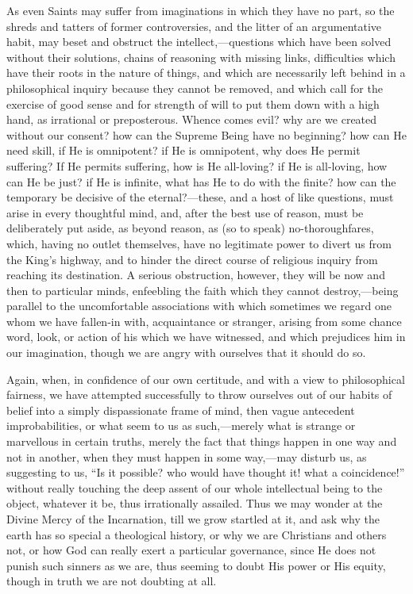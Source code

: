As even Saints may suffer from imaginations in which they
have no part, so the shreds and tatters of former controversies, and
the litter of an argumentative habit, may beset and obstruct the
intellect,—questions which have been solved without their solutions,
chains of reasoning with missing links, difficulties which have their
roots in the nature of things, and which are necessarily left behind
in a philosophical inquiry because they cannot be removed, and which
call for the exercise of good sense and for strength of will to put
them down with a high hand, as irrational or preposterous. Whence
comes evil? why are we created without our consent? how can the
Supreme Being have no beginning? how can He need skill, if He is
omnipotent? if He is omnipotent, why does He permit suffering? If He
permits suffering, how is He all-loving? if He is all-loving, how can
He be just? if He is infinite, what has He to do with the finite? how
can the temporary be decisive of the eternal?—these, and a host of
like questions, must arise in every thoughtful mind, and, after the
best use of reason, must be deliberately put aside, as beyond reason,
as (so to speak) no-thoroughfares, which, having no outlet themselves,
have no legitimate power to divert us from the King's highway, and to
hinder the direct course of religious inquiry from reaching its
destination. A serious obstruction, however, they will be now and then
to particular minds, enfeebling the faith which they cannot destroy,—being
parallel to the uncomfortable associations with which sometimes we
regard one whom we have fallen-in with, acquaintance or stranger,
arising from some chance word, look, or action of his which we have
witnessed, and which prejudices him in our imagination, though
we are angry with ourselves that it should do so.

Again, when, in confidence of our own certitude, and with a view to
philosophical fairness, we have attempted successfully to throw
ourselves out of our habits of belief into a simply dispassionate
frame of mind, then vague antecedent improbabilities, or what seem to
us as such,—merely what is strange or marvellous in certain truths,
merely the fact that things happen in one way and not in another, when
they must happen in some way,—may disturb us, as suggesting to us,
``Is it possible? who would have thought it! what a
coincidence!'' without really touching the deep assent of our
whole intellectual being to the object, whatever it be, thus
irrationally assailed. Thus we may wonder at the Divine Mercy of the
Incarnation, till we grow startled at it, and ask why the earth has so
special a theological history, or why we are Christians and others
not, or how God can really exert a particular governance, since He
does not punish such sinners as we are, thus seeming to doubt His
power or His equity, though in truth we are not doubting at all.

